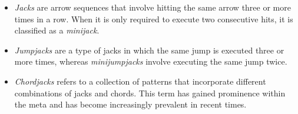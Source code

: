 \begin{itemize}
	\item \textit{Jacks} are arrow sequences that involve hitting the same arrow three or more times in a row. When it is only required to execute two consecutive hits, it is classified as a \textit{minijack}.
	      
	\item \textit{Jumpjacks} are a type of jacks in which the same jump is executed three or more times, whereas \textit{minijumpjacks} involve executing the same jump twice. 
	      
	\item \textit{Chordjacks} refers to a collection of patterns that incorporate different combinations of jacks and chords. This term has gained prominence within the meta and has become increasingly prevalent in recent times. 

\end{itemize}

